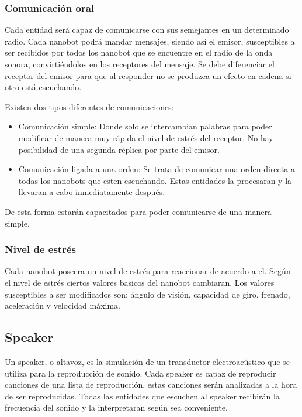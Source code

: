 \subsubsection{Comunicación oral}
\label{sec:comunicacion_oral}

Cada entidad será capaz de comunicarse con sus semejantes en un determinado radio.  Cada nanobot podrá mandar mensajes, siendo así el emisor, susceptibles a ser recibidos por todos los nanobot que se encuentre en el radio de la onda sonora, convirtiéndolos en los receptores del mensaje. Se debe diferenciar el receptor del emisor para que al responder no se produzca un efecto en cadena si otro está escuchando.

Existen dos tipos diferentes de comunicaciones:
\begin{itemize}
 \item Comunicación simple: Donde solo se intercambian palabras para poder modificar de manera muy rápida el nivel de estrés del receptor. No hay posibilidad de una segunda réplica por parte del emisor. 
 \item Comunicación ligada a una orden: Se trata de comunicar una orden directa a todas los nanobots que esten escuchando. Estas entidades la procesaran y la llevaran a cabo inmediatamente después.  
\end{itemize}

De esta forma estarán capacitados para poder comunicarse de una manera simple. 

\subsubsection{Nivel de estrés }
\label{sec:nivel_estres}
Cada nanobot poseera un nivel de estrés para reaccionar de acuerdo a el. Según el nivel de estrés  ciertos valores basicos del nanobot cambiaran. Los valores susceptibles a ser modificados son:  ángulo de visión, capacidad de giro, frenado, aceleración y velocidad máxima. 


\subsection{Speaker}
Un speaker, o altavoz, es la simulación de un transductor electroacústico que se utiliza para la reproducción de sonido. Cada speaker es capaz de reproducir canciones de una lista de reproducción, estas canciones serán analizadas a la hora de ser reproducidas. Todas las entidades que escuchen al speaker recibirán la frecuencia del sonido y la interpretaran según sea conveniente.
 
